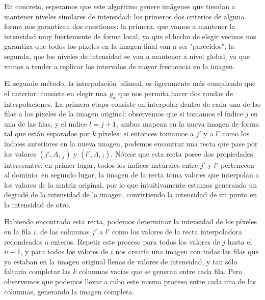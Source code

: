 \documentclass{article}
\begin{document}
En concreto, esperamos que este algoritmo genere imágenes que tiendan a mantener niveles similares de intensidad: los primeros dos criterios de alguna forma nos garantizan dos cuestiones: la primera, que vamos a mantener la intensidad muy fuertemente de forma local, ya que el hecho de elegir vecinos nos garantiza que todos los píxeles en la imagen final van a ser "parecidos"; la segunda, que los niveles de intensidad se van a mantener a nivel global, ya que vamos a tender a replicar los intervalos de mayor frecuencia en la imagen.

El segundo método, la interpolación bilineal, es ligeramente más complicado que el anterior: consiste en elegir una $g_k$ que nos permita hacer dos rondas de interpolaciones. La primera etapa consiste en interpolar dentro de cada una de las filas a los píxeles de la imagen original; observemos que si tomamos el índice $j$ en una de las filas, y el índice $l = j + 1$, ambos mapean en la nueva imagen de forma tal que están separados por $k$ píxeles: si entonces tomamos a $j'$ y a $l'$ como los índices anteriores en la nueva imagen, podemos encontrar una recta que pase por los valores $(j', A_{i, j})$ y $(l', A_{i, l})$. Nótese que esta recta posee dos propiedades interesantes: en primer lugar, todos los índices naturales entre $j'$ y $l'$ pertenecen al dominio; en segundo lugar, la imagen de la recta toma valores que interpolan a los valores de la matriz original, por lo que intuitivamente estamos generando un degradé de la intensidad de la imagen, convirtiendo la intensidad de un punto en la intensidad de otro. 

Habiendo encontrado esta recta, podemos determinar la intensidad de los píxeles en la fila $i$, de las columnas $j'$ a $l'$ como los valores de la recta interpoladora redondeados a enteros. Repetir este proceso para todos los valores de $j$ hasta el $n - 1$, y para todos los valores de $i$ nos crearía una imagen con todas las filas que ya estaban en la imagen original llenas de valores de intensidad, y tan sólo faltaría completar las $k$ columnas vacías que se generan entre cada fila. Pero observemos que podemos llevar a cabo este mismo proceso entre cada una de las columnas, generando la imagen completa.
\end{document}
